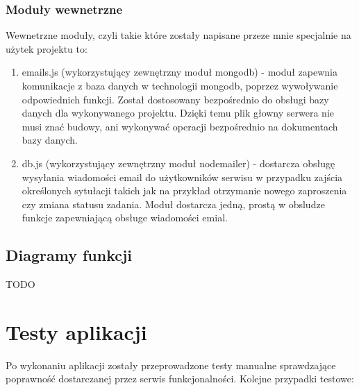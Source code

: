 \documentclass[12pt]{report}
\begin{document}
\subsection{Moduły wewnetrzne}
Wewnetrzne moduły, czyli takie które zostały napisane przeze mnie specjalnie na użytek projektu to:
\begin{enumerate}
\item emails.js (wykorzystujący zewnętrzny moduł mongodb) - moduł zapewnia komunikacje z baza danych w technologii mongodb, poprzez wywoływanie odpowiednich funkcji. 
Został dostosowany bezpośrednio do obsługi bazy danych dla wykonywanego projektu. 
Dzięki temu plik głowny serwera nie musi znać budowy, ani wykonywać operacji bezpośrednio na dokumentach bazy danych.
\item db.js (wykorzystujący zewnętrzny moduł nodemailer) - dostarcza obsługę wysyłania wiadomości email do użytkowników serwisu w przypadku zajścia określonych sytułacji takich jak na przykład otrzymanie nowego zaproszenia czy zmiana statusu zadania. Moduł dostarcza jedną, prostą w obsludze funkcje zapewniającą obsługe wiadomości emial. 
\end{enumerate}

\section{Diagramy funkcji}

TODO
 
\chapter{Testy aplikacji} \label{rozdz.5}

Po wykonaniu aplikacji zostały przeprowadzone testy manualne sprawdzające poprawność dostarczanej przez serwis funkcjonalności.
Kolejne przypadki testowe:
\end{document}
